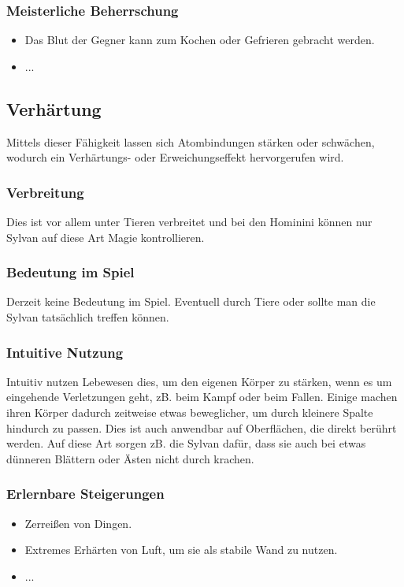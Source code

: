\subsubsection{Meisterliche Beherrschung} 
\begin{itemize}
	\item Das Blut der Gegner kann zum Kochen oder Gefrieren gebracht werden.
	\item ...
\end{itemize}



\subsection{Verhärtung}\label{sec:haertungsmagie}
Mittels dieser Fähigkeit lassen sich Atombindungen stärken oder schwächen, wodurch ein Verhärtungs- oder Erweichungseffekt hervorgerufen wird.

\subsubsection{Verbreitung}
Dies ist vor allem unter Tieren verbreitet und bei den Hominini können nur Sylvan auf diese Art Magie kontrollieren.

\subsubsection{Bedeutung im Spiel}
Derzeit keine Bedeutung im Spiel. Eventuell durch Tiere oder sollte man die Sylvan tatsächlich treffen können.

\subsubsection{Intuitive Nutzung}
Intuitiv nutzen Lebewesen dies, um den eigenen Körper zu stärken, wenn es um eingehende Verletzungen geht, zB. beim Kampf oder beim Fallen. Einige machen ihren Körper dadurch zeitweise etwas beweglicher, um durch kleinere Spalte hindurch zu passen. Dies ist auch anwendbar auf Oberflächen, die direkt berührt werden. Auf diese Art sorgen zB. die Sylvan dafür, dass sie auch bei etwas dünneren Blättern oder Ästen nicht durch krachen.

\subsubsection{Erlernbare Steigerungen}
\begin{itemize}
	\item Zerreißen von Dingen.
	\item Extremes Erhärten von Luft, um sie als stabile Wand zu nutzen.
	\item ...
\end{itemize}

